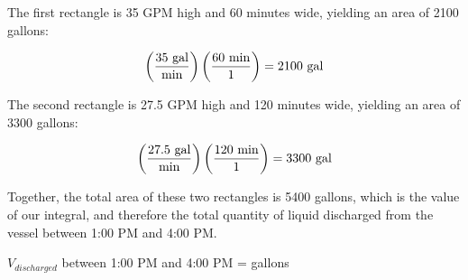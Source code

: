 The first rectangle is 35 GPM high and 60 minutes wide, yielding an area of 2100 gallons:

$$\left(35 \hbox{ gal} \over \hbox{min} \right) \left(60 \hbox{ min} \over 1 \right) = 2100 \hbox{ gal}$$

\vskip 10pt

The second rectangle is 27.5 GPM high and 120 minutes wide, yielding an area of 3300 gallons:

$$\left(27.5 \hbox{ gal} \over \hbox{min} \right) \left(120 \hbox{ min} \over 1 \right) = 3300 \hbox{ gal}$$

\vskip 10pt

Together, the total area of these two rectangles is 5400 gallons, which is the value of our integral, and therefore the total quantity of liquid discharged from the vessel between 1:00 PM and 4:00 PM.

\vskip 10pt

$V_{discharged}$ between 1:00 PM and 4:00 PM =  gallons











